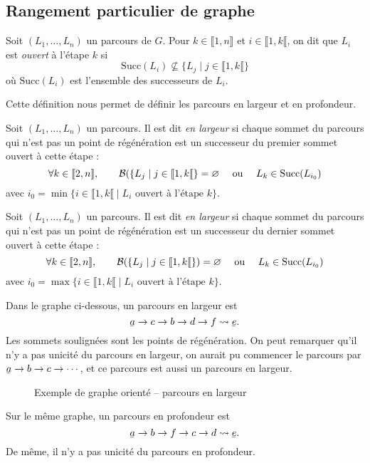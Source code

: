 \subsection{Rangement particulier de graphe}

\begin{defn}
	Soit $(L_1, \ldots, L_n)$\/ un parcours de $G$.
	Pour $k \in \llbracket 1,n \rrbracket$\/ et $i \in {\llbracket 1,k \llbracket}$, on dit que $L_i$\/ est \textit{ouvert} à l'étape $k$\/ si \[
		\mathrm{Succ}(L_i) \not\subseteq \{L_j  \mid j \in {\llbracket 1,k \llbracket}\}
	\] où $\mathrm{Succ}(L_i)$\/ est l'ensemble des successeurs de $L_i$.
\end{defn}

Cette définition nous permet de définir les parcours en largeur et en profondeur.

\begin{defn}
	Soit $(L_1, \ldots, L_n)$\/ un parcours. Il est dit \textit{en largeur} si chaque sommet du parcours qui n'est pas un point de régénération est un successeur du premier sommet ouvert à cette étape : \[
		\forall k \in \llbracket 2,n \rrbracket,\qquad\mathcal{B}(\{L_j  \mid j \in {\llbracket 1,k \llbracket}\} = \varnothing \quad\text{ ou }\quad L_k \in \mathrm{Succ}(L_{i_0})
	\] avec $i_0 = \min \{i \in {\llbracket 1,k \llbracket}  \mid L_i \text{ ouvert à l'étape } k\} $.
\end{defn}

\begin{defn}
	Soit $(L_1, \ldots, L_n)$\/ un parcours. Il est dit \textit{en largeur} si chaque sommet du parcours qui n'est pas un point de régénération est un successeur du dernier sommet ouvert à cette étape : \[
		\forall k \in \llbracket 2,n \rrbracket,\qquad\mathcal{B}(\{L_j  \mid j \in {\llbracket 1,k \llbracket}\}) = \varnothing \quad\text{ ou }\quad L_k \in \mathrm{Succ}(L_{i_0})
	\] avec $i_0 = \max\{i \in {\llbracket 1,k \llbracket}  \mid L_i \text{ ouvert à l'étape } k\} $.
\end{defn}

\begin{exm}
	Dans le graphe ci-dessous, un parcours en largeur est \[
		\ubar{a} \to c \to b \to d \to f \leadsto \ubar{e}
	.\] Les sommets soulignées sont les points de régénération.
	On peut remarquer qu'il n'y a pas unicité du parcours en largeur, on aurait pu commencer le parcours par $\ubar{a} \to b \to c \to \cdots$, et ce parcours est aussi un parcours en largeur.
	\begin{figure}[H]
		\centering
		\caption{Exemple de graphe orienté -- parcours en largeur}
	\end{figure}

	Sur le même graphe, un parcours en profondeur est \[
		\ubar{a} \to b \to f \to c \to d \leadsto \ubar{e}
	.\] De même, il n'y a pas unicité du parcours en profondeur.
\end{exm}

